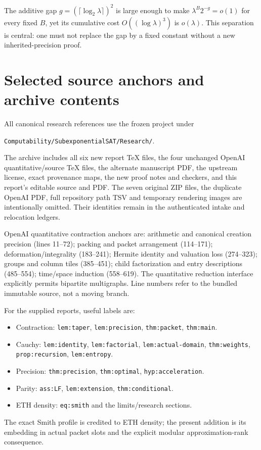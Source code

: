 \documentclass[11pt,letterpaper]{article}
\begin{document}
The additive gap $g=(\lceil\log_2\lambda\rceil)^2$ is large enough to make
$\lambda^B2^{-g}=o(1)$ for every fixed $B$, yet its cumulative cost
$O((\log\lambda)^3)$ is $o(\lambda)$. This separation is central: one must not
replace the gap by a fixed constant without a new inherited-precision proof.

\section{Selected source anchors and archive contents}
All canonical research references use the frozen project under
\begin{center}\small\texttt{Computability/SubexponentialSAT/Research/}.\end{center}
The archive includes all six new report TeX files, the four unchanged OpenAI quantitative/source
TeX files, the alternate manuscript PDF, the upstream license, exact provenance maps, the new proof notes and checkers,
and this report's editable source and PDF. The seven original ZIP files, the duplicate OpenAI
PDF, full repository path TSV and temporary rendering images are intentionally omitted.
Their identities remain in the authenticated intake and relocation ledgers.

OpenAI quantitative contraction anchors are: arithmetic and canonical creation precision
(lines 11--72); packing and packet arrangement (114--171); deformation/integrality (183--241);
Hermite identity and valuation loss (274--323); groups and column tiles (385--451);
child factorization and entry descriptions (485--554); time/space induction (558--619).
The quantitative reduction interface explicitly permits bipartite multigraphs.
Line numbers refer to the bundled immutable source, not a moving branch.

For the supplied reports, useful labels are:
\begin{itemize}
\item Contraction: \texttt{lem:taper}, \texttt{lem:precision}, \texttt{thm:packet}, \texttt{thm:main}.
\item Cauchy: \texttt{lem:identity}, \texttt{lem:factorial}, \texttt{lem:actual-domain},
\texttt{thm:weights}, \texttt{prop:recursion}, \texttt{lem:entropy}.
\item Precision: \texttt{thm:precision}, \texttt{thm:optimal}, \texttt{hyp:acceleration}.
\item Parity: \texttt{ass:LF}, \texttt{lem:extension}, \texttt{thm:conditional}.
\item ETH density: \texttt{eq:smith} and the limits/research sections.
\end{itemize}
The exact Smith profile is credited to ETH density; the present addition is its embedding in
actual packet slots and the explicit modular approximation-rank consequence.
\end{document}
